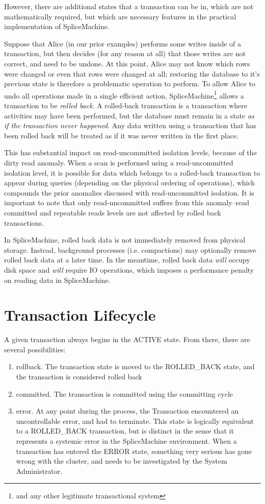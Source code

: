 However, there are additional states that a transaction can be in, which are not mathematically required, but which are necessary features in the practical implementation of SpliceMachine.

Suppose that Alice (in our prior examples) performs some writes inside of a transaction, but then decides (for any reason at all) that those writes are not correct, and need to be undone. At this point, Alice may not know which rows were changed or even that rows were changed at all; restoring the database to it's previous state is therefore a problematic operation to perform. To allow Alice to undo all operations made in a single efficient action, SpliceMachine\footnote{and any other legitimate transactional system} allows a transaction to be \emph{rolled back}. A rolled-back transaction is a transaction where activities may have been performed, but the database must remain in a state \emph{as if the transaction never happened}. Any data written using a transaction that has been rolled back will be treated as if it was never written in the first place.

This has substantial impact on read-uncommitted isolation levels, because of the dirty read anomaly. When a scan is performed using a read-uncommitted isolation level, it is possible for data which belongs to a rolled-back transaction to appear during queries (depending on the physical ordering of operations), which compounds the prior anomalies discussed with read-uncommitted isolation. It is important to note that only read-uncommitted suffers from this anomaly--read committed and repeatable reads levels are not affected by rolled back transactions.

In SpliceMachine, rolled back data is not immediately removed from physical storage. Instead, background processes (i.e. compactions) may optionally remove rolled back data at a later time. In the meantime, rolled back data \emph{will} occupy disk space and \emph{will} require IO operations, which imposes a performance penalty on reading data in SpliceMachine.

\section{Transaction Lifecycle}
A given transaction always begins in the ACTIVE state. From there, there are several possibilities:

\begin{enumerate}
	\item rollback. The transaction state is moved to the ROLLED\_BACK state, and the transaction is considered rolled back
	\item committed. The transaction is committed using the committing cycle
	\item error. At any point during the process, the Transaction encountered an uncontrollable error, and had to terminate. This state is logically equivalent to a ROLLED\_BACK transaction, but is distinct in the sense that it represents a systemic error in the SpliceMachine environment. When a transaction has entered the ERROR state, something very serious has gone wrong with the cluster, and needs to be investigated by the System Administrator.
\end{enumerate}

